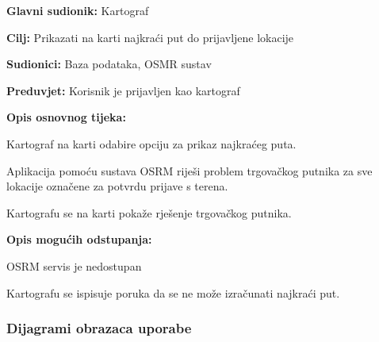 				\noindent {}
				\begin{packed_item}
					
					\item \textbf{Glavni sudionik: }Kartograf
					\item  \textbf{Cilj:} Prikazati na karti najkraći put do prijavljene lokacije
					\item  \textbf{Sudionici:} Baza podataka, OSMR sustav
					\item  \textbf{Preduvjet:} Korisnik je prijavljen kao kartograf
					\item  \textbf{Opis osnovnog tijeka:}
					
					\item[] \begin{packed_enum}
						
						\item Kartograf na karti odabire opciju za prikaz najkraćeg puta.
						\item Aplikacija pomoću sustava OSRM riješi problem trgovačkog putnika za sve lokacije označene za potvrdu prijave s terena.
						\item Kartografu se na karti pokaže rješenje trgovačkog putnika.
					\end{packed_enum}
					
					\item  \textbf{Opis mogućih odstupanja:}
					
					\item[] \begin{packed_item}
						
						\item[2.a] OSRM servis je nedostupan
						\item[] \begin{packed_enum}
							
							\item Kartografu se ispisuje poruka da se ne može izračunati najkraći put.
							
						\end{packed_enum}
						
					\end{packed_item}
				\end{packed_item}
					
				\subsubsection{Dijagrami obrazaca uporabe}
					
